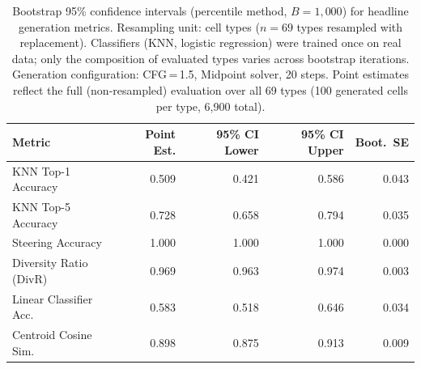 \documentclass[preprint,12pt]{elsarticle}
\begin{document}
\begin{table}[htbp]
\centering
\caption{Bootstrap 95\% confidence intervals (percentile method, $B{=}1{,}000$) for headline generation metrics. Resampling unit: cell types ($n{=}69$ types resampled with replacement). Classifiers (KNN, logistic regression) were trained once on real data; only the composition of evaluated types varies across bootstrap iterations. Generation configuration: CFG\,=\,1.5, Midpoint solver, 20 steps. Point estimates reflect the full (non-resampled) evaluation over all 69 types (100 generated cells per type, 6{,}900 total).}
\label{tab:s5_bootstrap_ci}
\begin{tabular}{lrrrr}
\toprule
Metric & Point Est. & 95\% CI Lower & 95\% CI Upper & Boot.\ SE \\
\midrule
KNN Top-1 Accuracy      & 0.509 & 0.421 & 0.586 & 0.043 \\
KNN Top-5 Accuracy      & 0.728 & 0.658 & 0.794 & 0.035 \\
Steering Accuracy       & 1.000 & 1.000 & 1.000 & 0.000 \\
Diversity Ratio (DivR)  & 0.969 & 0.963 & 0.974 & 0.003 \\
Linear Classifier Acc.  & 0.583 & 0.518 & 0.646 & 0.034 \\
Centroid Cosine Sim.    & 0.898 & 0.875 & 0.913 & 0.009 \\
\bottomrule
\end{tabular}
\end{table}
\end{document}
